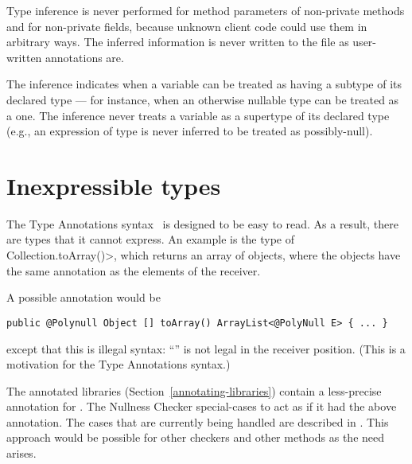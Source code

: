 
Type inference is never performed for method parameters of non-private
methods and for non-private fields, because unknown client code could use
them in arbitrary ways.  The inferred information is never written to the
 file as user-written annotations are.

The inference indicates when a variable can be treated as having a subtype
of its declared type --- for instance, when an otherwise nullable type can be
treated as a  one.  The inference never treats a variable as
a supertype of its declared type (e.g., an expression of 
type is never inferred to be treated as possibly-null).


\section{Inexpressible types\label{inexpressible-types}}

The Type Annotations syntax~\cite{jsr308} is designed to be easy to read.  As a result,
there are types that it cannot express.  An example is the type of 
\<Collection.toArray()>, which returns an array of objects, where the
objects have the same annotation as the elements of the receiver.

A possible annotation would be 

\begin{Verbatim}
public @Polynull Object [] toArray() ArrayList<@PolyNull E> { ... }
\end{Verbatim}

\noindent
except that this is illegal syntax:  ``'' is
not legal in the receiver position.  (This is a motivation for
the Type Annotations syntax.)

The annotated libraries (Section~\ref{annotating-libraries}) contain a less-precise annotation for
.  The Nullness Checker special-cases  to
act as if it had the above annotation.  The cases that
are currently being handled are described in
.
This approach would be possible for other checkers and other methods as the
need arises.


